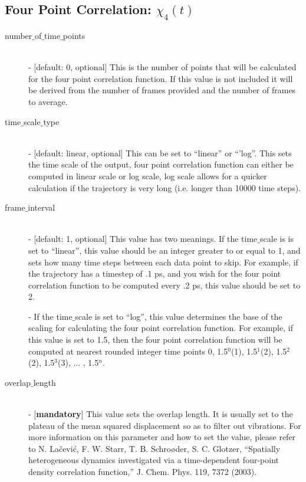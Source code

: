 \documentclass{article}
\begin{document}
\subsection{Four Point Correlation: $\chi_4(t)$} \label{sec::chi4_parm}
\begin{description}	
	\item[number$\_$of$\_$time$\_$points]\hfill \\
	- [default: 0, optional] This is the number of points that will be calculated for the four point correlation function.  If this value is not included it will be derived from the number of frames provided and the number of frames to average.
	
	\item[time$\_$scale$\_$type] \hfill \\
	- [default: linear, optional] This can be set to ``linear'' or ``'log''.  This sets the time scale of the output, four point correlation function can either be computed in linear scale or log scale, log scale allows for a quicker calculation if the trajectory is very long (i.e. longer than 10000 time steps).
	
	\item[frame$\_$interval] \hfill \\
	- [default: 1, optional] This value has two meanings.  If the time$\_$scale is is set to ``linear'', this value should be an integer greater to or equal to 1, and sets how many time steps between each data point to skip.  For example, if the trajectory has a timestep of .1 ps, and you wish for the four point correlation function to be computed every .2 ps, this value should be set to 2. 
	
	- If the time$\_$scale is set to ``log'', this value determines the base of the scaling for calculating the four point correlation function.  For example, if this value is set to 1.5, then the four point correlation function will be computed at nearest rounded integer time points 0, 1.5$^0$(1), 1.5$^1$(2), 1.5$^2$(2), 1.5$^3$(3), ... , 1.5$^{n}$.
	
	\item[overlap$\_$length] \hfill \\
	- [\textbf{mandatory}] This value sets the overlap length. It is usually set to the plateau of the mean squared displacement so as to filter out vibrations. For more information on this parameter and how to set the value, please refer to N. Lačević, F. W. Starr, T. B. Schroøder, S. C. Glotzer, ``Spatially heterogeneous dynamics investigated via a time-dependent four-point density correlation function,'' J. Chem. Phys. 119, 7372 (2003).
\end{description}
\end{document}
